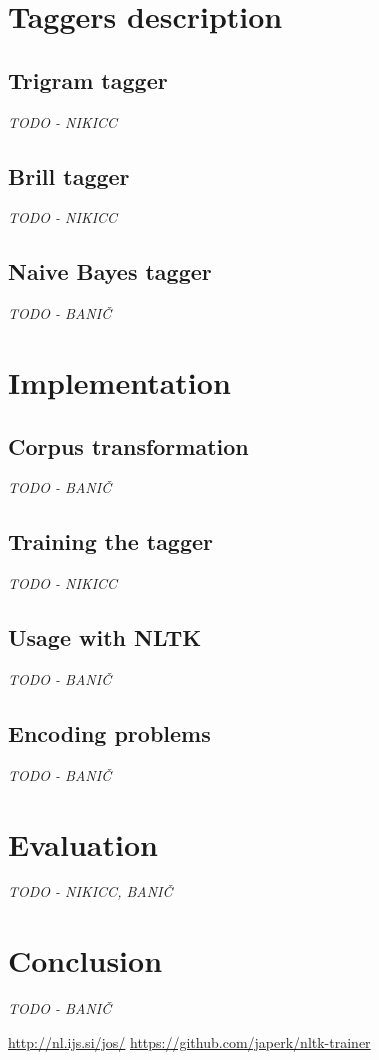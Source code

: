\documentclass[11pt,a4paper,english,twocolumn]{article}
\begin{document}
\section{Taggers description}
\subsection{Trigram tagger}
\textit{TODO - NIKICC}
\subsection{Brill tagger}
\textit{TODO - NIKICC}
\subsection{Naive Bayes tagger}
\textit{TODO - BANIČ}
\section{Implementation}
\subsection{Corpus transformation}
\textit{TODO - BANIČ}
\subsection{Training the tagger}
\textit{TODO - NIKICC}
\subsection{Usage with NLTK}
\textit{TODO - BANIČ}
\subsection{Encoding problems}
\textit{TODO - BANIČ}
\section{Evaluation}\label{Evaluation}
\textit{TODO - NIKICC, BANIČ}
\section{Conclusion}
\textit{TODO - BANIČ}


\begin{thebibliography}{99}
 \url{http://nl.ijs.si/jos/}
 \url{https://github.com/japerk/nltk-trainer}

\end{thebibliography}
\end{document}
